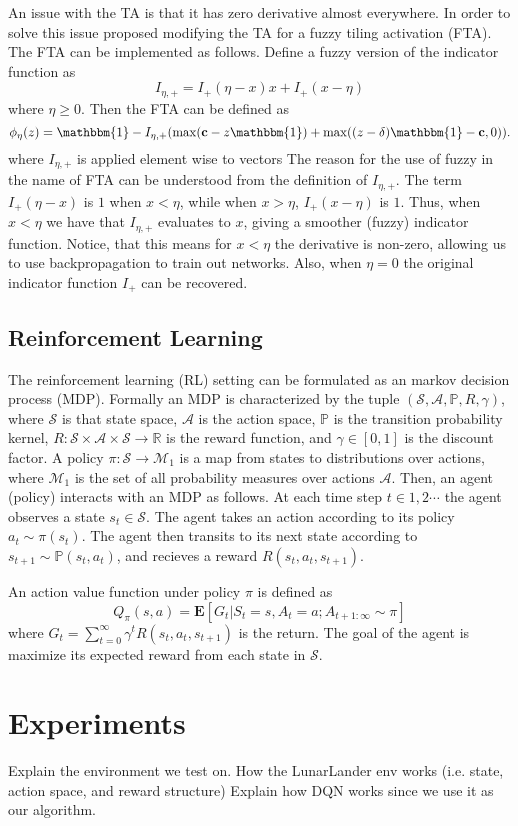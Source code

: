 \documentclass{article}
\newcommand{\RR}{\mathbb{R}}
\newcommand{\PP}{\mathbb{P}}
\newcommand{\cS}{\mathcal{S}}
\newcommand{\cA}{\mathcal{A}}
\newcommand{\cM}{\mathcal{M}}
\begin{document}
An issue with the TA is that it has zero derivative almost everywhere.
In order to solve this issue \cite{pan2019fuzzy} proposed modifying the TA for a fuzzy tiling activation (FTA).
The FTA can be implemented as follows.
Define a fuzzy version of the indicator function as 
$$I_{\eta, +} = I_+(\eta -x)x + I_+(x - \eta)$$
where $\eta \ge 0$.
Then the FTA can be defined as
$$\phi_\eta(z) = \mathbbm{1} - I_{\eta, +} (\max(\mathbf{c} - z \mathbbm{1}) + \max((z-\delta)\mathbbm{1} - \mathbf{c}, 0)).$$
where $I_{\eta, +}$ is applied element wise to vectors
The reason for the use of fuzzy in the name of FTA can be understood from the definition of $I_{\eta, +}$.
The term $I_+(\eta -x)$ is $1$ when $x < \eta$, while when $x > \eta$, $I_+(x - \eta)$ is $1$.
Thus, when $x < \eta$ we have that $I_{\eta ,+}$ evaluates to $x$, giving a smoother (fuzzy) indicator function.
Notice, that this means for $x < \eta$ the derivative is non-zero, allowing us to use backpropagation to train out networks.
Also, when $\eta = 0$ the original indicator function $I_+$ can be recovered.

\subsection{Reinforcement Learning}
The reinforcement learning (RL) setting can be formulated as an markov decision process (MDP).
Formally an MDP is characterized by the tuple $(\cS, \cA, \PP, R, \gamma)$, where $\cS$ is that state space, $\cA$ is the action space,
$\PP$ is the transition probability kernel, $R: \cS \times \cA \times \cS \to \RR$ is the reward function, and $\gamma \in [0, 1]$ is the discount factor.
A policy $\pi: \cS \to \cM_1$ is a map from states to distributions over actions, where $\cM_1$ is the set of all probability measures over actions $\cA$.
Then, an agent (policy) interacts with an MDP as follows.
At each time step $t \in 1, 2 \cdots$ the agent observes a state $s_t \in \cS$.
The agent takes an action according to its policy $a_t \sim \pi(s_t)$.
The agent then transits to its next state according to $s_{t+1} \sim \PP(s_t, a_t)$, and recieves a reward $R(s_t, a_t, s_{t+1})$.

An action value function under policy $\pi$ is defined as 
$$Q_\pi(s, a) = \mathbf{E}[G_t|S_t =s, A_t=a; A_{t+1: \infty} \sim \pi]$$
where $G_t = \sum_{t=0}^\infty \gamma^t R(s_t, a_t, s_{t+1})$ is the return.
The goal of the agent is maximize its expected reward from each state in $\cS$.


\section{Experiments} \label{sec:experiments}
Explain the environment we test on. 
How the LunarLander env works (i.e. state, action space, and reward structure)
Explain how DQN works since we use it as our algorithm.
\end{document}

